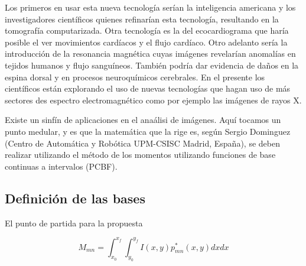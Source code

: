 \documentclass[b5paper, 11pt]{book}
\newcommand{\0}{\mathbf{0}}
\theoremstyle{estiloB}
\theoremstyle{estiloC}
\theoremstyle{estiloD}
\begin{document}
Los primeros en usar esta nueva tecnolog\'ia ser\'ian la inteligencia americana y los investigadores cient\'ificos quienes refinar\'ian esta tecnolog\'ia, resultando en la tomograf\'ia computarizada. Otra tecnolog\'ia es la del ecocardiograma que har\'ia posible el ver movimientos card\'iacos y el flujo card\'iaco. Otro adelanto ser\'ia la introducci\'on de la resonancia magn\'etica cuyas im\'agenes revelar\'ian anomal\'ias en tejidos humanos y flujo sangu\'ineos. Tambi\'en podr\'ia dar evidencia de daños en la espina dorsal y en procesos neuroqu\'imicos cerebrales. En el presente los cient\'ificos est\'an explorando el uso de nuevas tecnolog\'ias que hagan uso de m\'as sectores des espectro electromagn\'etico como por ejemplo las im\'agenes de rayos X.

Existe un sinfín de aplicaciones en el ana\'alisi de im\'agenes. Aqu\'i tocamos un punto medular, y es que la matem\'atica que la rige es, seg\'un Sergio Dominguez (Centro de Autom\'atica y Rob\'otica UPM-CSISC Madrid, España),  se deben realizar utilizando el m\'etodo de los momentos utilizando funciones de base continuas a intervalos (PCBF).

\subsection{Definici\'on de las bases}

El punto de partida para la propuesta



\[
M_{mn}= \int_{x_0}^{x_f} \int_{y_0}^{y_f} I(x,y)p_{mn}^{*} (x,y) dx dx
\]
\end{document}
